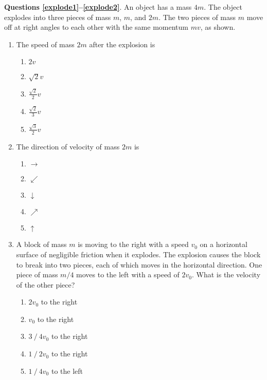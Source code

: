 \documentclass{../../../oss-apphys}
\begin{document}
\begin{multicols}{2}
  \textbf{Questions \ref{explode1}--\ref{explode2}}. An object has a mass $4m$.
  The object explodes into three pieces of mass $m$, $m$, and $2m$. The two
  pieces of mass $m$ move off at right angles to each other with the same
  momentum $mv$, as shown.
  \begin{center}
  \end{center}
  
  \begin{enumerate}[leftmargin=18pt,resume]
  \item The speed of mass $2m$ after the explosion is
    \label{explode1}
    \begin{enumerate}[nosep,leftmargin=18pt,label=(\Alph*)]
    \item $2v$
    \item $\displaystyle\sqrt2v$
    \item $\displaystyle\frac{\sqrt2}2v$
    \item $\displaystyle\frac{\sqrt2}3v$
    \item $\displaystyle\frac{\sqrt3}2v$
    \end{enumerate}
    
  \item The direction of velocity of mass $2m$ is
    \label{explode2}
    \begin{enumerate}[nosep,leftmargin=18pt,label=(\Alph*)]
    \item $\rightarrow$
    \item $\swarrow$
    \item $\downarrow$
    \item $\nearrow$
    \item $\uparrow$
    \end{enumerate}
  
  \item A block of mass $m$ is moving to the right with a speed $v_0$ on a
    horizontal surface of negligible friction when it explodes. The explosion
    causes the block to break into two pieces, each of which moves in the
    horizontal direction. One piece of mass $m/4$ moves to the left with a
    speed of $2v_0$. What is the velocity of the other piece?
    \begin{enumerate}[nosep,leftmargin=18pt,label=(\Alph*)]
    \item$2v_0$ to the right
    \item$v_0$ to the right
    \item$3⁄4 v_0$ to the right
    \item$1⁄2 v_0$ to the right
    \item$1⁄4 v_0$ to the left
    \end{enumerate}
  \end{enumerate}
  \columnbreak
  

\end{multicols}
\end{document}
